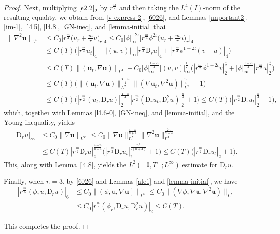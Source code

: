 \documentclass[11pt,reqno]{amsart}
\numberwithin{rk}{section}
\numberwithin{prop}{section}
\numberwithin{mydef}{section}
\numberwithin{lem}{section}
\numberwithin{equation}{section}
\numberwithin{thm}{section}
\begin{document}
\begin{proof}
Next, multiplying $\eqref{e2.2}_2$ by $r^\frac{m}{4}$ and then taking the $L^4(I)$-norm of the resulting equality, we obtain from \eqref{v-express-2}, \eqref{6026}, and Lemmas \ref{important2}, \ref{im-1}, \ref{l4.5}, \ref{l4.8}, \ref{GN-ineq}, and \ref{lemma-initial} that
\begin{equation*}
\begin{aligned}
\|\nabla^2 \boldsymbol{u}\|_{L^4}&\leq  C_0 \Big|r^\frac{m}{4} \big(u_r+\frac{m}{r}u\big)_r\Big|_4\leq  C_0|\phi|_\infty^{-2\iota}\Big|r^\frac{m}{4}\phi^{2\iota}\big(u_r+\frac{m}{r}u\big)_r\Big|_4\\
&\leq C(T)\big(|r^\frac{m}{4} u_t|_4+|(u,v)|_\infty |r^\frac{m}{4}\mathrm{D}_r u|_4+|r^\frac{m}{4}\phi^{1-2\iota}(v-u)|_4\big)\\
&\leq C(T)\|(\boldsymbol{u}_t,\nabla\boldsymbol{u})\|_{L^4}+C_0|\phi|_\infty^\frac{1-2\iota}{2}|(u,v)|_\infty^\frac{1}{2}\big(|r^\frac{m}{2}\phi^{1-2\iota} v|_2^\frac{1}{2}+|\phi|_\infty^\frac{1-2\iota}{2} |r^\frac{m}{2}u|_2^\frac{1}{2}\big)\\
&\leq C(T)\big(\|(\boldsymbol{u}_t,\nabla\boldsymbol{u})\|_{L^2}^\frac{4-n}{4}\|(\nabla\boldsymbol{u}_t,\nabla^2\boldsymbol{u})\|_{L^2}^\frac{n}{4} +1\big)\\
&\leq C(T)\big(|r^\frac{m}{2}(u_t,\mathrm{D}_r u)|_2^\frac{4-n}{4} |r^\frac{m}{2}(\mathrm{D}_r u_t,\mathrm{D}_r^2 u)|_2^\frac{n}{4} +1\big) \leq C(T)\big(|r^\frac{m}{2}\mathrm{D}_r u_t|_2^\frac{n}{4}+1\big),
\end{aligned}
\end{equation*}
which, together with Lemmas \ref{l4.6-0}, \ref{GN-ineq}, and \ref{lemma-initial}, and the Young inequality, yields 
\begin{equation}\label{ur-infty}
\begin{aligned}
|\mathrm{D}_r u|_\infty&\leq C_0\|\nabla \boldsymbol{u}\|_{L^\infty}\leq C_0\|\nabla \boldsymbol{u}\|_{L^2}^\frac{4-n}{n+4}\|\nabla^2\boldsymbol{u}\|_{L^4}^\frac{2n}{n+4}\\
&\leq C(T) |r^\frac{m}{2}\mathrm{D}_r u|_{2}^\frac{4-n}{n+4}\big( |r^\frac{m}{2}\mathrm{D}_r u_t|_2^\frac{n^2}{2(n+4)}+1\big) \leq C(T) \big(|r^\frac{m}{2}\mathrm{D}_r u_t|_2+1\big).
\end{aligned}   
\end{equation}
This, along with Lemma \ref{l4.8}, yields the $L^2([0,T];L^\infty)$ estimate for $\mathrm{D}_r u$.

Finally, when $n=3$, by \eqref{6026} and Lemmas \ref{ale1} and \ref{lemma-initial}, we have
\begin{equation}
\begin{aligned}
|r^\frac{m}{6}(\phi,u,\mathrm{D}_r u) |_{6} &\leq C_0\|(\phi,\boldsymbol{u},\nabla \boldsymbol{u})\|_{L^6} \leq C_0\|(\nabla \phi,\nabla \boldsymbol{u},\nabla^2 \boldsymbol{u})\|_{L^{2}}\\
&\leq C_0|r^\frac{m}{2}(\phi_r,\mathrm{D}_ru,\mathrm{D}_r^2 u) |_{2}\le C(T).
\end{aligned} 
\end{equation}

This completes the proof.
\end{proof}
\end{document}
